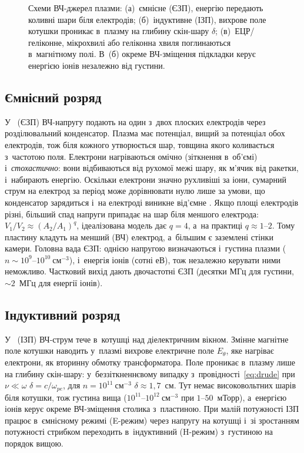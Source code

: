 \begin{figure}[ht]
	\centering
	\caption{Схеми ВЧ-джерел плазми: (а)~ємнісне (ЄЗП), енергію передають коливні шари біля
	електродів; (б)~індуктивне (ІЗП), вихрове поле котушки проникає в~плазму на глибину скін-шару
	$\delta$; (в)~ЕЦР/геліконне, мікрохвилі або геліконна хвиля поглинаються в~магнітному полі.
	В~(б) окреме ВЧ-зміщення підкладки керує енергією іонів незалежно від густини.}
	\label{fig:rf-sources}
\end{figure}

\subsection*{Ємнісний розряд}

У~ (ЄЗП) ВЧ-напругу подають на один з~двох плоских
електродів через розділювальний конденсатор. Плазма має потенціал, вищий за потенціал
обох електродів, тож біля кожного утворюється шар, товщина якого коливається з~частотою поля.
Електрони нагріваються омічно (зіткнення в~об'ємі) і~\emph{стохастично}: вони відбиваються від
рухомої межі шару, як м'ячик від ракетки, і~набирають енергію. Оскільки електрони значно
рухливіші за іони, сумарний струм на електрод за період може дорівнювати нулю лише за умови, що
конденсатор зарядиться і~на електроді виникне від'ємне . Якщо площі
електродів різні, більший спад напруги припадає на шар біля меншого електрода:
$V_1/V_2\approx(A_2/A_1)^q$, ідеалізована модель дає $q=4$, а~на практиці $q\approx1$--$2$. Тому
пластину кладуть на менший (ВЧ) електрод, а~більшим є заземлені стінки камери. Головна вада ЄЗП:
однією напругою визначаються і~густина плазми ($n\sim10^{9}$--$10^{10}~\mathrm{см}^{-3}$), і~енергія іонів
(сотні еВ), тож незалежно керувати ними неможливо. Частковий вихід дають двочастотні ЄЗП
(десятки МГц для густини, $\sim2$~МГц для енергії іонів).

\subsection*{Індуктивний розряд}

У~ (ІЗП) ВЧ-струм тече в~котушці над діелектричним
вікном. Змінне магнітне поле котушки наводить у~плазмі вихрове електричне поле $E_\theta$, яке
нагріває електрони, як вторинну обмотку трансформатора. Поле проникає в~плазму лише на
глибину скін-шару: у~беззіткненнєвому випадку з~провідності~\eqref{eq:drude} при $\nu\ll\omega$
$\delta=c/\omega_{pe}$, для $n=10^{11}~\mathrm{см}^{-3}$ $\delta\approx1{,}7$~см. Тут немає
високовольтних шарів біля котушки, тож густина вища ($10^{11}$--$10^{12}~\mathrm{см}^{-3}$ при
$1$--$50$~мТорр), а~енергією іонів керує окреме ВЧ-зміщення столика з~пластиною. При малій
потужності ІЗП працює в~ємнісному режимі (E-режим) через напругу на котушці і~зі зростанням
потужності стрибком переходить в~індуктивний (H-режим) з~густиною на порядок вищою.

